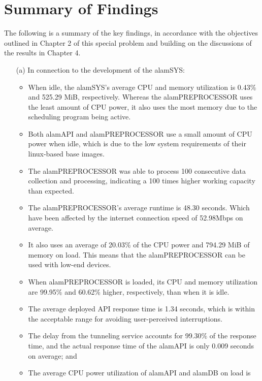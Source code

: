 \section{Summary of Findings}
\label{sec:sum_find}
The following is a summary of the key findings, in accordance with 
the objectives outlined in Chapter 2 of this special problem and 
building on the discussions of the results in Chapter 4.

\begin{itemize}
    \item[(a)] In connection to the development of the alamSYS:
        \begin{itemize}
            \item When idle, the alamSYS's average CPU and memory utilization 
            is 0.43\% and 525.29 MiB, respectively. Whereas the 
            alamPREPROCESSOR uses the least amount of CPU power, 
            it also uses the most memory due to the scheduling program being active.
            \item Both alamAPI and alamPREPROCESSOR use a small amount of CPU power when idle, 
            which is due to the low system requirements of their linux-based base images.
            \item The alamPREPROCESSOR was able to process 100 consecutive data collection 
            and processing, indicating a 100 times higher working capacity than expected.
            \item The alamPREPROCESSOR's average runtime is 48.30 seconds. Which have
            been affected by the internet connection speed of 52.98Mbps on average.
            \item It also uses an average of 20.03\% of the CPU power and 794.29 MiB of memory on load. 
            This means that the alamPREPROCESSOR can be used with low-end devices.
            \item When alamPREPROCESSOR is loaded, its CPU and memory utilization are 
            99.95\% and 60.62\% higher, respectively, than when it is idle.
            \item The average deployed API response time is 1.34 seconds, 
            which is within the acceptable range for avoiding user-perceived interruptions.
            \item The delay from the tunneling service accounts for 99.30\% of the response time, 
            and the actual response time of the alamAPI is only 0.009 seconds on average; and
            \item The average CPU power utilization of alamAPI and alamDB on load is 

\end{itemize}
\end{itemize}
